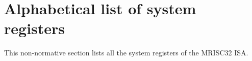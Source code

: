 %

\onecolumn

\chapter{Alphabetical list of system registers}

This non-normative section lists all the system registers of the MRISC32 ISA.



\twocolumn
